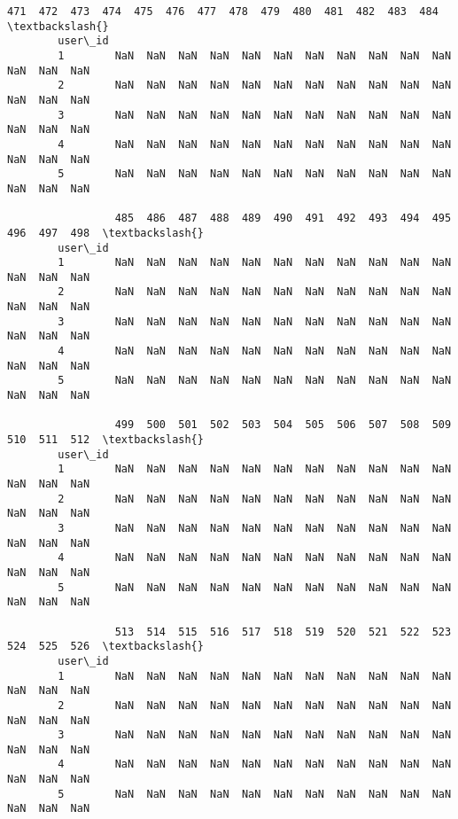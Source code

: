 \documentclass[11pt]{article}
\begin{document}
\begin{Verbatim}[commandchars=\\\{\}]
                 471  472  473  474  475  476  477  478  479  480  481  482  483  484  \textbackslash{}
        user\_id                                                                         
        1        NaN  NaN  NaN  NaN  NaN  NaN  NaN  NaN  NaN  NaN  NaN  NaN  NaN  NaN   
        2        NaN  NaN  NaN  NaN  NaN  NaN  NaN  NaN  NaN  NaN  NaN  NaN  NaN  NaN   
        3        NaN  NaN  NaN  NaN  NaN  NaN  NaN  NaN  NaN  NaN  NaN  NaN  NaN  NaN   
        4        NaN  NaN  NaN  NaN  NaN  NaN  NaN  NaN  NaN  NaN  NaN  NaN  NaN  NaN   
        5        NaN  NaN  NaN  NaN  NaN  NaN  NaN  NaN  NaN  NaN  NaN  NaN  NaN  NaN   
        
                 485  486  487  488  489  490  491  492  493  494  495  496  497  498  \textbackslash{}
        user\_id                                                                         
        1        NaN  NaN  NaN  NaN  NaN  NaN  NaN  NaN  NaN  NaN  NaN  NaN  NaN  NaN   
        2        NaN  NaN  NaN  NaN  NaN  NaN  NaN  NaN  NaN  NaN  NaN  NaN  NaN  NaN   
        3        NaN  NaN  NaN  NaN  NaN  NaN  NaN  NaN  NaN  NaN  NaN  NaN  NaN  NaN   
        4        NaN  NaN  NaN  NaN  NaN  NaN  NaN  NaN  NaN  NaN  NaN  NaN  NaN  NaN   
        5        NaN  NaN  NaN  NaN  NaN  NaN  NaN  NaN  NaN  NaN  NaN  NaN  NaN  NaN   
        
                 499  500  501  502  503  504  505  506  507  508  509  510  511  512  \textbackslash{}
        user\_id                                                                         
        1        NaN  NaN  NaN  NaN  NaN  NaN  NaN  NaN  NaN  NaN  NaN  NaN  NaN  NaN   
        2        NaN  NaN  NaN  NaN  NaN  NaN  NaN  NaN  NaN  NaN  NaN  NaN  NaN  NaN   
        3        NaN  NaN  NaN  NaN  NaN  NaN  NaN  NaN  NaN  NaN  NaN  NaN  NaN  NaN   
        4        NaN  NaN  NaN  NaN  NaN  NaN  NaN  NaN  NaN  NaN  NaN  NaN  NaN  NaN   
        5        NaN  NaN  NaN  NaN  NaN  NaN  NaN  NaN  NaN  NaN  NaN  NaN  NaN  NaN   
        
                 513  514  515  516  517  518  519  520  521  522  523  524  525  526  \textbackslash{}
        user\_id                                                                         
        1        NaN  NaN  NaN  NaN  NaN  NaN  NaN  NaN  NaN  NaN  NaN  NaN  NaN  NaN   
        2        NaN  NaN  NaN  NaN  NaN  NaN  NaN  NaN  NaN  NaN  NaN  NaN  NaN  NaN   
        3        NaN  NaN  NaN  NaN  NaN  NaN  NaN  NaN  NaN  NaN  NaN  NaN  NaN  NaN   
        4        NaN  NaN  NaN  NaN  NaN  NaN  NaN  NaN  NaN  NaN  NaN  NaN  NaN  NaN   
        5        NaN  NaN  NaN  NaN  NaN  NaN  NaN  NaN  NaN  NaN  NaN  NaN  NaN  NaN   
        

\end{Verbatim}
\end{document}
